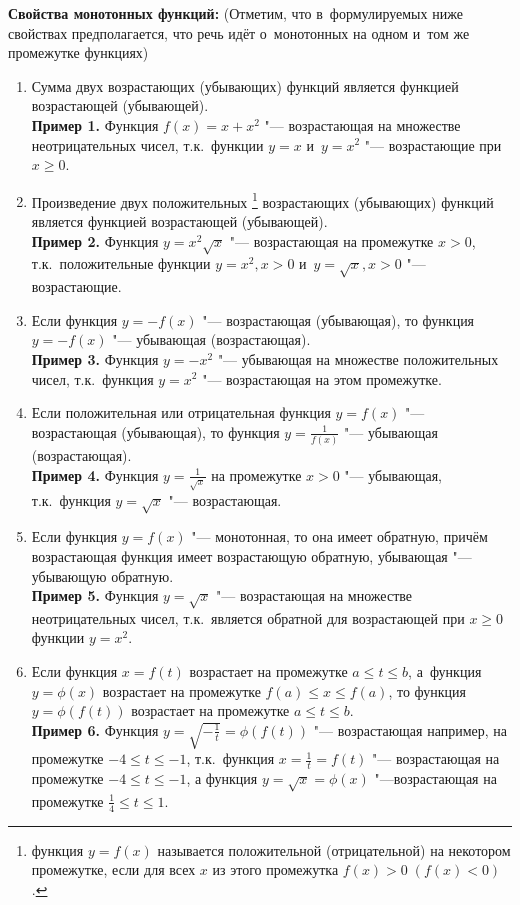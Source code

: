 \textbf{Свойства монотонных функций:}
(Отметим, что в~формулируемых ниже свойствах предполагается,
что речь идёт о~монотонных на одном и~том же промежутке функциях)
\begin{enumerate}
\item \label{lst_1_6_1} Сумма двух возрастающих (убывающих) функций является функцией
возрастающей (убывающей).\\
\textbf{Пример 1.} Функция $f(x) = x + x^{2}$ "--- возрастающая
на множестве неотрицательных чисел, т.к.\ функции $y = x$ и~$y = x^{2}$
"--- возрастающие при $x \geqslant 0$.

\item \label{lst_1_6_2} Произведение двух положительных
\footnote{функция $y = f(x)$ называется положительной (отрицательной)
на некотором промежутке, если для всех $x$ из этого промежутка
$f(x) > 0 \; (f(x) < 0)$.}
возрастающих (убывающих) функций является функцией возрастающей
(убывающей). \\
\textbf{Пример 2.} Функция $y = x^{2}\sqrt{x}$ "--- возрастающая
на промежутке $x > 0$, т.к.\ положительные функции $y = x^{2}, x > 0$
и~$y = \sqrt{x}, x > 0$ "--- возрастающие.

\item \label{lst_1_6_3} Если функция $y = -f(x)$ "--- возрастающая (убывающая),
то функция $y = -f(x)$ "--- убывающая (возрастающая). \\
\textbf{Пример 3.} Функция $y = -x^{2}$ "--- убывающая на множестве
положительных чисел, т.к.\ функция $y = x^{2}$ "--- возрастающая
на этом промежутке.

\item \label{lst_1_6_4} Если положительная или отрицательная функция $y = f(x)$
"--- возрастающая (убывающая), то функция
$\displaystyle y = \frac{1}{f(x)}$ "--- убывающая (возрастающая). \\
\textbf{Пример 4.} Функция $\displaystyle y = \frac{1}{\sqrt{x}}$
на промежутке $x > 0$ "--- убывающая, т.к.\ функция $y = \sqrt{x}$
"--- возрастающая.

\item \label{lst_1_6_5} Если функция $y = f(x)$ "--- монотонная, то она имеет обратную,
причём возрастающая функция имеет возрастающую обратную,
убывающая "--- убывающую обратную. \\
\textbf{Пример 5.} Функция $y = \sqrt{x}$ "--- возрастающая на множестве
неотрицательных чисел, т.к.\ является обратной для возрастающей
при $x \geqslant 0$ функции $y = x^{2}$.

\item Если функция $x = f(t)$ возрастает на промежутке
$a \leqslant t \leqslant b$, а~функция $y = \phi(x)$ возрастает
на промежутке $f(a) \leqslant x \leqslant f(a)$,
то функция $y = \phi(f(t))$ возрастает на промежутке
$a \leqslant t \leqslant b$. \\
\textbf{Пример 6.} Функция
$\displaystyle y = \sqrt{-\frac{1}{t}} = \phi(f(t))$ "--- возрастающая
например, на промежутке $-4 \leqslant t \leqslant -1$,
т.к.\ функция $\displaystyle x = \frac{1}{t} = f(t)$ "--- возрастающая
на промежутке $-4 \leqslant t \leqslant -1$,
а функция $y = \sqrt{x} = \phi(x)$ "---возрастающая на промежутке
$\displaystyle \frac{1}{4} \leqslant t \leqslant 1$.


\end{enumerate}
